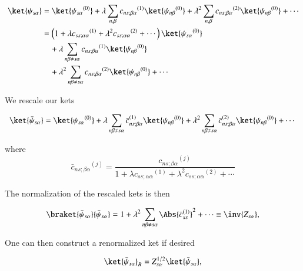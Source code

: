 \begin{equation}\label{eqn:qmTwoL5a:170}
\begin{aligned}
\ket{\psi_{s \alpha}} 
&= 
\ket{{\psi_{s \alpha}}^{(0)}} 
+
\lambda
\sum_{n, \beta} {c_{ns;\beta \alpha}}^{(1)} \ket{{\psi_{n \beta}}^{(0)}} 
+ 
\lambda^2
\sum_{n, \beta} {c_{ns;\beta \alpha}}^{(2)} \ket{{\psi_{n \beta}}^{(0)}} 
+ \cdots \\
&=
\left(
1 
+ \lambda {c_{ss ; \alpha \alpha}}^{(1)} 
+ \lambda^2 {c_{ss ; \alpha \alpha}}^{(2)} 
+ \cdots
\right)
\ket{{\psi_{s \alpha}}^{(0)}}  \\
&\quad + 
\lambda
\sum_{n\beta \ne s\alpha} {c_{ns;\beta \alpha}}^{(1)} \ket{{\psi_{n \beta}}^{(0)}}  \\
&\quad +
\lambda^2
\sum_{n\beta \ne s\alpha} {c_{ns;\beta \alpha}}^{(2)} \ket{{\psi_{n \beta}}^{(0)}} 
+ \cdots
\end{aligned}
\end{equation}

We rescale our kets 

\begin{equation}\label{eqn:qmTwoL5a:190}
\ket{\bar{\psi}_{s \alpha}} 
=
\ket{{\psi_{s \alpha}}^{(0)}} 
+ 
\lambda
\sum_{n\beta \ne s\alpha} {\bar{c}_{ns;\beta \alpha}}^{(1)} \ket{{\psi_{n \beta}}^{(0)}} 
+
\lambda^2
\sum_{n\beta \ne s\alpha} {\bar{c}_{ns;\beta \alpha}}^{(2)} \ket{{\psi_{n \beta}}^{(0)}} 
+ \cdots
\end{equation}

where
\begin{equation}\label{eqn:qmTwoL5a:210}
{\bar{c}_{ns;\beta \alpha}}^{(j)} = 
\frac{{c_{ns;\beta \alpha}}^{(j)}}
{
1 
+ \lambda {c_{ss ; \alpha \alpha}}^{(1)} 
+ \lambda^2 {c_{ss ; \alpha \alpha}}^{(2)} 
+ \cdots
}
\end{equation}

The normalization of the rescaled kets is then

\begin{equation}\label{eqn:qmTwoL5a:230}
\braket{\bar{\psi}_{s \alpha}}{\bar{\psi}_{s \alpha}} 
=
1
+ 
\lambda^2
\sum_{n\beta \ne s\alpha} \Abs{{\bar{c}_{ss}}^{(1)}}^2
+
\cdots
\equiv \inv{Z_{s \alpha}},
\end{equation}

One can then construct a renormalized ket if desired

\begin{equation}\label{eqn:qmTwoL5a:250}
\ket{\bar{\psi}_{s \alpha}}_R = Z_{s \alpha}^{1/2} \ket{\bar{\psi}_{s \alpha}},
\end{equation}

